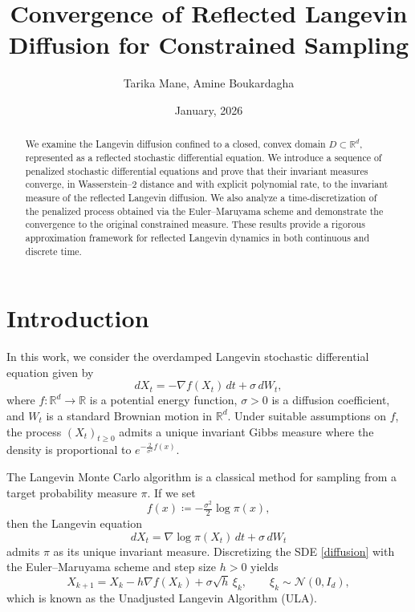 \documentclass[amsfonts, reqno]{amsart}
\title{Convergence of Reflected Langevin Diffusion for Constrained Sampling}
\author{Tarika Mane, Amine Boukardagha}
\date{January, 2026}
\theoremstyle{definition}
\theoremstyle{remark}
\newcommand{\bbR}{\mathbb{R}}
\numberwithin{equation}{section}
\begin{document}

\begin{abstract} We examine the Langevin diffusion confined to a closed, convex domain $D\subset\mathbb{R}^d$, represented as a reflected stochastic differential equation. We introduce a sequence of penalized stochastic differential equations and prove that their invariant measures converge, in Wasserstein--2 distance and with explicit polynomial rate, to the invariant 
measure of the reflected Langevin diffusion. We also analyze a 
time-discretization of the penalized process obtained via the Euler–Maruyama 
scheme and demonstrate the convergence to the original constrained measure. These results provide a rigorous approximation framework for reflected Langevin dynamics in both continuous and discrete time.
\end{abstract}

\maketitle
\thispagestyle{empty}
\section{Introduction}
In this work, we consider the overdamped Langevin stochastic differential equation given by
\begin{equation} \label{diffusion}
dX_t = -\nabla f(X_t)\,dt + \sigma\,dW_t,
\end{equation}
where $f: \bbR^d \to \bbR$ is a potential energy function, $\sigma > 0$ is a diffusion coefficient, and $ W_t $ is a standard Brownian motion in $ \mathbb{R}^d $. Under suitable assumptions on $f$, the process $(X_t)_{t \geq 0} $ admits a unique invariant Gibbs measure where the density is proportional to $ e^{-\frac{2}{\sigma^2}f(x)}$.

The Langevin Monte Carlo algorithm is a classical method for sampling from a target probability measure $\pi$.  
If we set 
\[
f(x) \coloneqq -\tfrac{\sigma^2}{2}\log \pi(x),
\]
then the Langevin equation
\[
dX_t = \nabla \log \pi(X_t)\,dt + \sigma\,dW_t
\]
admits $\pi$ as its unique invariant measure.  
Discretizing the SDE \eqref{diffusion} with the Euler--Maruyama scheme and step size $h>0$ yields
\begin{equation*}
X_{k+1} = X_k - h \nabla f(X_k) + \sigma\sqrt{h}\,\xi_k, 
\qquad \xi_k \sim \mathcal{N}(0,I_d),
\end{equation*}
which is known as the Unadjusted Langevin Algorithm (ULA).
\end{document}
